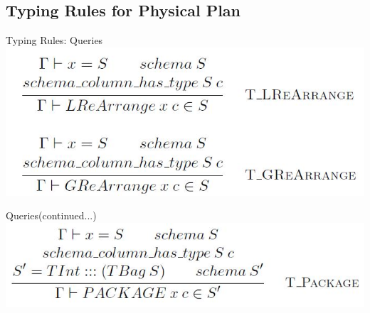 \subsection{Typing Rules for Physical Plan}
\begin{frame}{Typing Rules: Queries}
\centering
\includegraphics[scale=0.4]{Images/TypingRules/ReArrange.JPG}  
\end{frame}

\begin{frame}{Queries(continued...)}
\centering
\includegraphics[scale=0.4]{Images/TypingRules/Package.JPG} 
\end{frame}